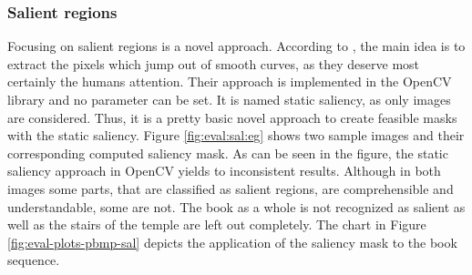 \subsubsection{Salient regions}

Focusing on salient regions is a novel approach.
According to \citeauthor{hou2007saliency} \citep{hou2007saliency}, the main idea is to extract the pixels which jump out of smooth curves, as they deserve most certainly the humans attention.
Their approach is implemented in the OpenCV library and no parameter can be set.
It is named static saliency, as only images are considered.
Thus, it is a pretty basic novel approach to create feasible masks with the static saliency.
\newline\newline\noindent Figure \ref{fig:eval:sal:eg} shows two sample images and their corresponding computed saliency mask.
As can be seen in the figure, the static saliency approach in OpenCV yields to inconsistent results.
Although in both images some parts, that are classified as salient regions, are comprehensible and understandable, some are not.
The book as a whole is not recognized as salient as well as the stairs of the temple are left out completely.
The chart in Figure \ref{fig:eval-plots-pbmp-sal} depicts the application of the saliency mask to the book sequence.


